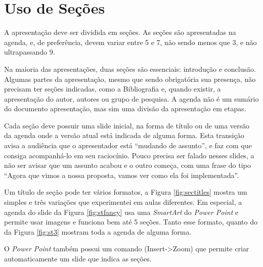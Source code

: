 \section{Uso de Seções}

A apresentação deve ser dividida em seções. As seções são apresentadas na agenda, e, de preferência, devem variar entre 5 e 7, não sendo menos que 3, e não ultrapassando 9.

Na maioria das apresentações, duas seções são essenciais: introdução e conclusão. Algumas partes da apresentação, mesmo que sendo obrigatória sua presença, não precisam ter seções indicadas, como a Bibliografia e, quando existir, a apresentação do autor, autores ou grupo de pesquisa. A agenda não é um sumário do documento apresentação, mas sim uma divisão da apresentação em etapas.

Cada seção deve possuir uma slide inicial, na forma de título ou de uma versão da agenda onde a versão atual está indicada de alguma forma. Esta transição avisa a audiência que o apresentador está ``mudando de assunto'', e faz com que consiga acompanhá-lo em seu raciocínio. Pouco precisa ser falado nesses slides, a não ser avisar que um assunto acabou e o outro começa, com uma frase do tipo ``Agora que vimos a nossa proposta, vamos ver como ela foi implementada''.


 Um título de seção pode ter vários formatos, a Figura \ref{fig:sectitles} mostra um simples e três variações que experimentei em aulas diferentes. Em especial, a agenda do slide da Figura \ref{fig:stfancy} usa uma \textit{SmartArt} do \textit{Power Point} e permite usar imagens e funciona bem até 5 seções. Tanto esse formato, quanto do da Figura \ref{fig:st3} mostram toda a agenda de alguma forma.

 O \textit{Power Point} também possui um comando (Insert->Zoom) que permite criar automaticamente um slide que indica as seções.

